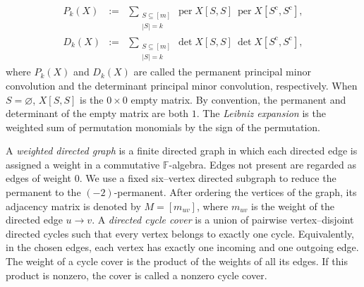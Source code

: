 \documentclass[11pt,a4paper]{article}
\begin{document}
\begin{eqnarray*}
  P_k(X)
  &:=&\sum_{\substack{S\subseteq[m]\\|S|=k}}
      \operatorname{per} X[S,S]~\operatorname{per} X[S^{\mathrm{c}},S^{\mathrm{c}}],\\
  D_k(X)
  &:=&\sum_{\substack{S\subseteq[m]\\|S|=k}}
      \operatorname{det} X[S,S]~\operatorname{det} X[S^{\mathrm{c}},S^{\mathrm{c}}],
\end{eqnarray*}
where $P_k(X)$ and $D_k(X)$ are called the permanent principal minor convolution and the determinant principal minor convolution, respectively. When $S=\varnothing$, $X[S,S]$ is the $0\times0$ empty matrix. By convention, the permanent and determinant of the empty matrix are both $1$. The {\em Leibniz expansion} is the weighted sum of permutation monomials by the sign of the permutation.

A {\em weighted directed graph} is a finite directed graph in which each directed edge is assigned a weight in a commutative $\mathbb{F}$-algebra. Edges not present are regarded as edges of weight $0$.
We use a fixed six–vertex directed subgraph to reduce the permanent to the $(-2)$-permanent. After ordering the vertices of the graph, its adjacency matrix is denoted by $M=[m_{uv}]$, where $m_{uv}$ is the weight of the directed edge $u\to v$. A {\em directed cycle cover} is a union of pairwise vertex–disjoint directed cycles such that every vertex belongs to exactly one cycle. Equivalently, in the chosen edges, each vertex has exactly one incoming and one outgoing edge. The weight of a cycle cover is the product of the weights of all its edges. If this product is nonzero, the cover is called a nonzero cycle cover.
\end{document}
